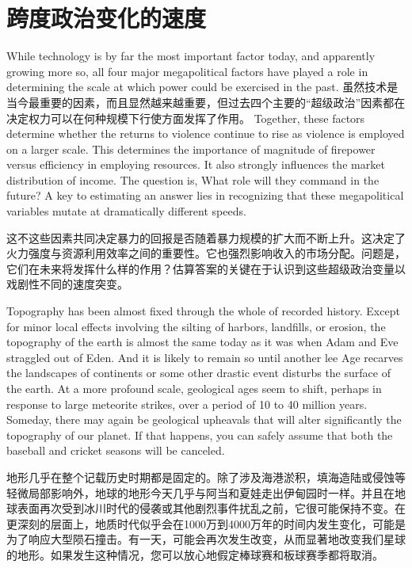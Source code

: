 \section{跨度政治变化的速度}
\begin{paracol}{2}
While technology is by far the most important factor today, and apparently growing more so, all four major megapolitical factors have played a role in determining the scale at which power could be exercised in the past.  
\switchcolumn
虽然技术是当今最重要的因素，而且显然越来越重要，但过去四个主要的“超级政治”因素都在决定权力可以在何种规模下行使方面发挥了作用。
\switchcolumn*
Together, these factors determine whether the returns to violence continue to rise as violence is employed on a larger scale. This determines the importance of magnitude of firepower versus efficiency in employing resources. It also strongly influences the market distribution of income. The question is, What role will they command in the future? A key to estimating an answer lies in recognizing that these megapolitical variables mutate at dramatically different speeds. 

\switchcolumn
这不这些因素共同决定暴力的回报是否随着暴力规模的扩大而不断上升。这决定了火力强度与资源利用效率之间的重要性。它也强烈影响收入的市场分配。问题是，它们在未来将发挥什么样的作用？估算答案的关键在于认识到这些超级政治变量以戏剧性不同的速度突变。

\switchcolumn*
Topography has been almost fixed through the whole of recorded history. Except for minor local effects involving the silting of harbors, landfills, or erosion, the topography of the earth is almost the same today as it was when Adam and Eve straggled out of Eden. And it is likely to remain so until another lee Age recarves the landscapes of continents or some other drastic event disturbs the surface of the earth. At a more profound scale, geological ages seem to shift, perhaps in response to large meteorite strikes, over a period of 10 to 40 million years. Someday, there may again be geological upheavals that will alter significantly the topography of our planet. If that happens, you can safely assume that both the baseball and cricket seasons will be canceled.

\switchcolumn
地形几乎在整个记载历史时期都是固定的。除了涉及海港淤积，填海造陆或侵蚀等轻微局部影响外，地球的地形今天几乎与阿当和夏娃走出伊甸园时一样。并且在地球表面再次受到冰川时代的侵袭或其他剧烈事件扰乱之前，它很可能保持不变。在更深刻的层面上，地质时代似乎会在1000万到4000万年的时间内发生变化，可能是为了响应大型陨石撞击。有一天，可能会再次发生改变，从而显著地改变我们星球的地形。如果发生这种情况，您可以放心地假定棒球赛和板球赛季都将取消。


\end{paracol}
